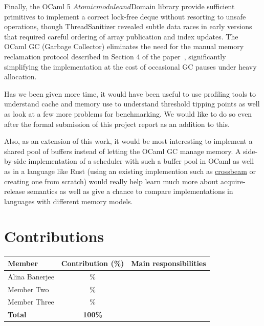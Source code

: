 \documentclass[11pt,a4paper]{article}
\begin{document}
Finally, the OCaml 5 ${Atomic} module and ${Domain} library
provide sufficient primitives to implement a correct lock-free deque
without resorting to unsafe operations, though ThreadSanitizer revealed
subtle data races in early versions that required careful ordering of
array publication and index updates. The OCaml GC (Garbage Collector) eliminates the
need for the
manual memory reclamation protocol described in Section 4 of the
paper~\cite{chase2005dynamic}, significantly simplifying the
implementation at the cost of occasional GC pauses under heavy allocation.

Has we been given more time, it would have been useful to use profiling
tools to understand cache and memory use to understand threshold tipping points
as well as look at a few more problems for benchmarking. We would like to do so
even after the formal submission of this project report as an addition to this.

Also, as an extension of this work, it would be most interesting to
implement a shared pool of buffers instead of letting the OCaml GC manage
memory.  A side-by-side implementation of a scheduler with such a buffer pool
in OCaml as well as in a language like Rust (using an existing implemention such as
\href{https://docs.rs/crossbeam-deque/latest/crossbeam_deque/}{crossbeam} or
creating one from scratch) would really help learn much more about
acquire-release semantics as well as give a chance to compare implementations in
languages with different memory models.

\section*{Contributions}
\label{sec:contributions}


\begin{center}
\begin{tabular}{@{}lcl@{}}
\toprule
\textbf{Member} & \textbf{Contribution (\%)} & \textbf{Main responsibilities} \\
\midrule
Alina Banerjee  & \% & \\
Member Two      & \% & \\
Member Three    & \% & \\
\midrule
\textbf{Total} & \textbf{100\%} & \\
\bottomrule
\end{tabular}
\end{center}



\end{document}
